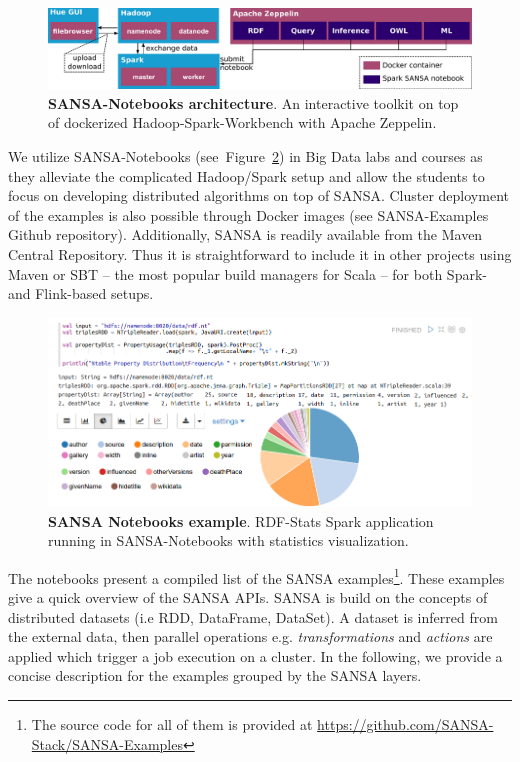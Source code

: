 \begin{figure}
    \centering
    \includegraphics[width=\textwidth]{images/7_implemenation_and_usecases/SANSA-Notebook-architecture.pdf}
    \caption{\textbf{SANSA-Notebooks architecture}.
    An interactive toolkit on top of dockerized Hadoop-Spark-Workbench with Apache Zeppelin.}
    \label{fig:notebooks_arch}
\end{figure}

We utilize SANSA-Notebooks (see~Figure~\ref{fig:notebooks}) in Big Data labs and courses as they alleviate the complicated Hadoop/Spark setup and allow the students to focus on developing distributed algorithms on top of SANSA. 
Cluster deployment of the examples is also possible through Docker images (see SANSA-Examples Github repository). 
Additionally, SANSA is readily available from the Maven Central Repository. 
Thus it is straightforward to include it in other projects using Maven or SBT -- the most popular build managers for Scala -- for both Spark- and Flink-based setups. 

\begin{figure}
    \centering
    \includegraphics[width=.9\textwidth]{images/7_implemenation_and_usecases/RDF-Statistics_withoutlangTAG-cropped.png}
    \caption{\textbf{SANSA Notebooks example}.
    RDF-Stats Spark application running in SANSA-Notebooks with statistics visualization.}
    \label{fig:notebooks}
\end{figure}

The notebooks present a compiled list of the SANSA examples\footnote{\scriptsize{The source code for all of them is provided at \url{https://github.com/SANSA-Stack/SANSA-Examples}}}.
These examples give a quick overview of the SANSA \gls{API}s.
SANSA is build on the concepts of distributed datasets (i.e \gls{RDD}, DataFrame, DataSet). 
A dataset is inferred from the external data, then parallel operations e.g. \textit{transformations} and \textit{actions} are applied which trigger a job execution on a cluster.
In the following, we provide a concise description for the examples grouped by the SANSA layers.

